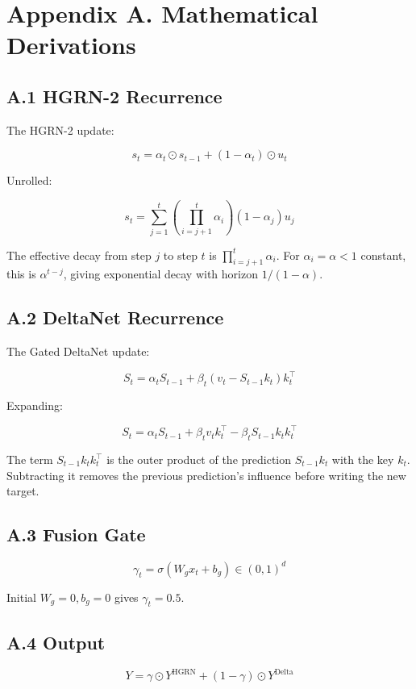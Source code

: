\section{Appendix A. Mathematical Derivations}

\subsection{A.1 HGRN-2 Recurrence}

The HGRN-2 update:

\[
s_t = \alpha_t \odot s_{t-1} + (1 - \alpha_t) \odot u_t
\tag{A.1}
\]

Unrolled:

\[
s_t = \sum_{j=1}^{t} \left( \prod_{i=j+1}^{t} \alpha_i \right) (1 - \alpha_j) u_j
\tag{A.2}
\]

The effective decay from step $j$ to step $t$ is $\prod_{i=j+1}^t \alpha_i$. 
For $\alpha_i = \alpha < 1$ constant, this is $\alpha^{t-j}$, giving 
exponential decay with horizon $1/(1-\alpha)$.

\subsection{A.2 DeltaNet Recurrence}

The Gated DeltaNet update:

\[
S_t = \alpha_t S_{t-1} + \beta_t (v_t - S_{t-1} k_t) k_t^\top
\tag{A.3}
\]

Expanding:

\[
S_t = \alpha_t S_{t-1} + \beta_t v_t k_t^\top - \beta_t S_{t-1} k_t k_t^\top
\tag{A.4}
\]

The term $S_{t-1} k_t k_t^\top$ is the outer product of the prediction 
$S_{t-1} k_t$ with the key $k_t$. Subtracting it removes the previous 
prediction's influence before writing the new target.

\subsection{A.3 Fusion Gate}

\[
\gamma_t = \sigma(W_g x_t + b_g) \in (0, 1)^d
\tag{A.5}
\]

Initial $W_g = 0, b_g = 0$ gives $\gamma_t = 0.5$.

\subsection{A.4 Output}

\[
Y = \gamma \odot Y^\text{HGRN} + (1 - \gamma) \odot Y^\text{Delta}
\tag{A.6}
\]

